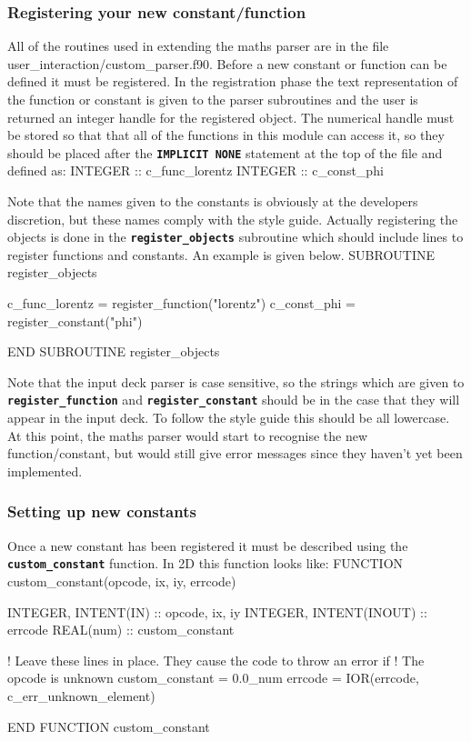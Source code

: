 \documentclass[12pt,a4paper]{article}
\newcommand{\inlinecode}[1]{{\color{warwickred} \bf\texttt{#1}}}
\newcommand{\EPOCH}{{\color{warwickdark}\fontfamily{phv}\selectfont{EPOCH}}}
\newenvironment{boxverbatim}{\lboxverbatim{none}}{\endlboxverbatim}
\begin{document}
\subsubsection{Registering your new constant/function}
All of the routines used in extending the maths parser are in the file
user\_interaction/custom\_parser.f90.  Before a new constant or function
can be defined it must be registered. In the registration phase the text
representation of the function or constant is given to the parser subroutines
and the user is returned an integer handle for the registered object. The
numerical handle must be stored so that that all of the functions in this
module can access it, so they should be placed after the \inlinecode{IMPLICIT
NONE} statement at the top of the file and defined as:
\begin{boxverbatim}
INTEGER :: c_func_lorentz
INTEGER :: c_const_phi
\end{boxverbatim}

Note that the names given to the constants is obviously at the developers
discretion, but these names comply with the {\EPOCH} style guide.
Actually registering the objects is done in the \inlinecode{register\_objects}
subroutine which should include lines to register functions and constants.
An example is given below.
\begin{boxverbatim}
SUBROUTINE register_objects

  c_func_lorentz = register_function("lorentz")
  c_const_phi = register_constant("phi")

END SUBROUTINE register_objects
\end{boxverbatim}

Note that the input deck parser is case sensitive, so the strings which are
given to \inlinecode{register\_function} and \inlinecode{register\_constant}
should be in the case that they will appear in the input deck. To follow the
{\EPOCH} style guide this should be all lowercase. At this point, the maths
parser would start to recognise the new function/constant, but would still
give error messages since they haven't yet been implemented.

\subsubsection{Setting up new constants}

Once a new constant has been registered it must be described using the
\inlinecode{custom\_constant} function. In 2D this function looks like:
\begin{boxverbatim}
FUNCTION custom_constant(opcode, ix, iy, errcode)

  INTEGER, INTENT(IN) :: opcode, ix, iy
  INTEGER, INTENT(INOUT) :: errcode
  REAL(num) :: custom_constant

  ! Leave these lines in place. They cause the code to throw an error if
  ! The opcode is unknown
  custom_constant = 0.0_num
  errcode = IOR(errcode, c_err_unknown_element)

END FUNCTION custom_constant
\end{boxverbatim}
\end{document}
